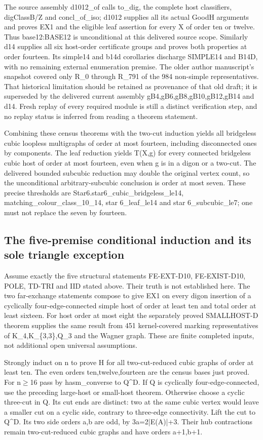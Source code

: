 \documentclass[11pt,a4paper]{article}
\begin{document}
The source assembly d1012\_of calls to\_dig, the complete host classifiers, digClassB/Z and concl\_of\_iso; d1012 supplies all its actual GoodH arguments and proves EX1 and the eligible leaf assertion for every X of order ten or twelve. Thus base12:BASE12 is unconditional at this delivered source scope. Similarly d14 supplies all six host-order certificate groups and proves both properties at order fourteen. Its simple14 and b14d corollaries discharge SIMPLE14 and B14D, with no remaining external enumeration premise. The older author manuscript's snapshot covered only R\_0 through R\_791 of the 984 non-simple representatives. That historical limitation should be retained as provenance of that old draft; it is superseded by the delivered current assembly gB4,gB6,gB8,gB10,gB12,gB14 and d14. Fresh replay of every required module is still a distinct verification step, and no replay status is inferred from reading a theorem statement.

Combining these census theorems with the two-cut induction yields all bridgeless cubic loopless multigraphs of order at most fourteen, including disconnected ones by components. The leaf reduction yields T(X,g) for every connected bridgeless cubic host of order at most fourteen, even when g is in a digon or a two-cut. The delivered bounded subcubic reduction may double the original vertex count, so the unconditional arbitrary-subcubic conclusion is order at most seven. These precise thresholds are Star6.star6\_cubic\_bridgeless\_le14, matching\_colour\_class\_10\_14, star 6\_leaf\_le14 and star 6\_subcubic\_le7; one must not replace the seven by fourteen.

\subsection{The five-premise conditional induction and its sole triangle exception}
Assume exactly the five structural statements FE-EXT-D10, FE-EXIST-D10, POLE, TD-TRI and IID stated above. Their truth is not established here. The two far-exchange statements compose to give EX1 on every digon insertion of a cyclically four-edge-connected simple host of order at least ten and total order at least sixteen. For host order at most eight the separately proved SMALLHOST-D theorem supplies the same result from 451 kernel-covered marking representatives of K\_4,K\_\{3,3\},Q\_3 and the Wagner graph. These are finite completed inputs, not additional open universal assumptions.

Strongly induct on n to prove H for all two-cut-reduced cubic graphs of order at least ten. The even orders ten,twelve,fourteen are the census bases just proved. For n\ensuremath{\geq}16 pass by hasm\_converse to Q\textasciicircum{}D. If Q is cyclically four-edge-connected, use the preceding large-host or small-host theorem. Otherwise choose a cyclic three-cut in Q. Its cut ends are distinct: two at the same cubic vertex would leave a smaller cut on a cyclic side, contrary to three-edge connectivity. Lift the cut to Q\textasciicircum{}D. Its two side orders a,b are odd, by 3a=2|E(A)|+3. Their hub contractions remain two-cut-reduced cubic graphs and have orders a+1,b+1.
\end{document}
